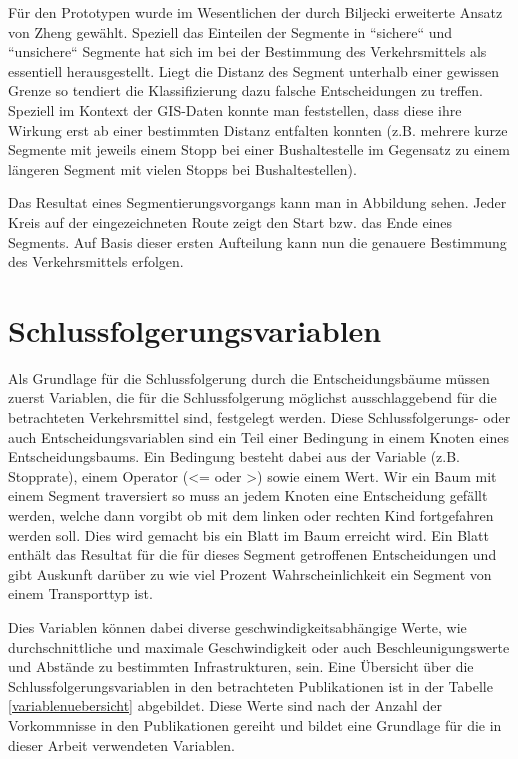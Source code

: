 Für den Prototypen wurde im Wesentlichen der durch Biljecki erweiterte Ansatz von Zheng gewählt. Speziell das Einteilen der Segmente in ``sichere`` und ``unsichere`` Segmente hat sich im bei der Bestimmung des Verkehrsmittels als essentiell herausgestellt. Liegt die Distanz  des Segment unterhalb einer gewissen Grenze so tendiert die Klassifizierung dazu falsche Entscheidungen zu treffen. Speziell im Kontext der GIS-Daten konnte man feststellen, dass diese ihre Wirkung erst ab einer bestimmten Distanz entfalten konnten (z.B. mehrere kurze Segmente mit jeweils einem Stopp bei einer Bushaltestelle im Gegensatz zu einem längeren Segment mit vielen Stopps bei Bushaltestellen).

 Das Resultat eines Segmentierungsvorgangs kann man in Abbildung  sehen. Jeder Kreis auf der eingezeichneten Route zeigt den Start bzw. das Ende eines Segments. Auf Basis dieser ersten Aufteilung kann nun die genauere Bestimmung des Verkehrsmittels erfolgen.

\clearpage

\section{Schlussfolgerungsvariablen}
\label{schlussfolgerungsvariablen}

Als Grundlage für die Schlussfolgerung durch die Entscheidungsbäume müssen zuerst Variablen, die für die Schlussfolgerung möglichst ausschlaggebend für die betrachteten Verkehrsmittel sind, festgelegt werden. Diese Schlussfolgerungs- oder auch Entscheidungsvariablen sind ein Teil einer Bedingung in einem Knoten eines Entscheidungsbaums. Ein Bedingung besteht dabei aus der Variable (z.B. Stopprate), einem Operator (<= oder >) sowie einem Wert. Wir ein Baum mit einem Segment traversiert so muss an jedem Knoten eine Entscheidung gefällt werden, welche dann vorgibt ob mit dem linken oder rechten Kind fortgefahren werden soll. Dies wird gemacht bis ein Blatt im Baum erreicht wird. Ein Blatt enthält das Resultat für die für dieses Segment getroffenen Entscheidungen und gibt Auskunft darüber zu wie viel Prozent Wahrscheinlichkeit ein Segment von einem Transporttyp ist.

Dies Variablen können dabei diverse geschwindigkeitsabhängige Werte, wie durchschnittliche und maximale Geschwindigkeit oder auch Beschleunigungswerte und  Abstände zu bestimmten Infrastrukturen, sein. Eine Übersicht über die Schlussfolgerungsvariablen in den betrachteten Publikationen ist in der Tabelle \ref{variablenuebersicht} abgebildet. Diese Werte sind nach der Anzahl der Vorkommnisse in den Publikationen gereiht und bildet eine Grundlage für die in dieser Arbeit verwendeten Variablen. 

